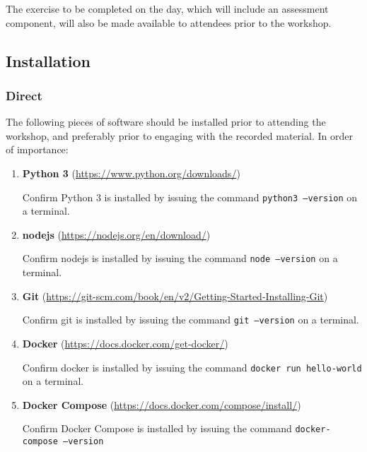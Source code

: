 \documentclass{article}
\begin{document}
The exercise to be completed on the day, which will include an assessment component, will also be made available to attendees prior to the workshop.

\subsection{Installation}

\subsubsection{Direct}

The following pieces of software should be installed prior to attending the workshop, and preferably prior to engaging with the recorded material. 
In order of importance:

\begin{enumerate}

    \item \textbf{Python 3}
    (\href{https://www.python.org/downloads/}{https://www.python.org/downloads/})

    Confirm Python 3 is installed by issuing the command
    \texttt{python3 --version} on a terminal.

    \item \textbf{nodejs}
    (\href{https://nodejs.org/en/download/}{https://nodejs.org/en/download/})

    Confirm nodejs is installed by issuing the command
    \texttt{node --version} on a terminal.

    \item \textbf{Git}
    (\href{https://git-scm.com/book/en/v2/Getting-Started-Installing-Git}{https://git-scm.com/book/en/v2/Getting-Started-Installing-Git})

    Confirm git is installed by issuing the command
    \texttt{git --version} on a terminal.

    \item \textbf{Docker}
    (\href{https://docs.docker.com/get-docker/}{https://docs.docker.com/get-docker/})

    Confirm docker is installed by issuing the command
    \texttt{docker run hello-world} on a terminal.

    \item \textbf{Docker Compose}
    (\href{https://docs.docker.com/compose/install/}{https://docs.docker.com/compose/install/})

    Confirm Docker Compose is installed by issuing the command \newline
    \texttt{docker-compose --version}

\end{enumerate}
\end{document}
